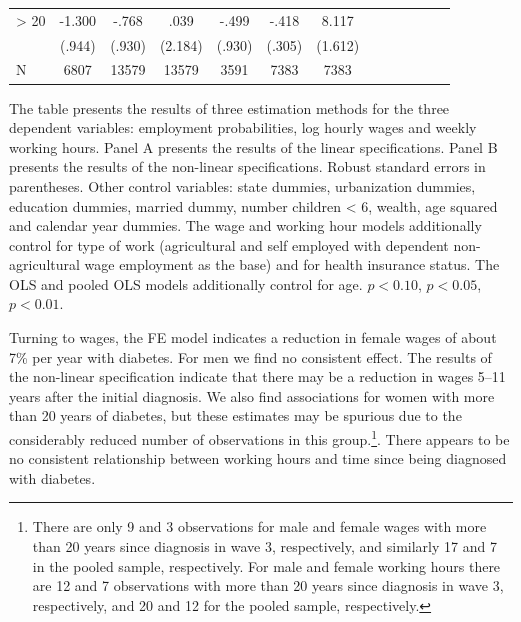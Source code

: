 \begin{table}
\begin{center}
\begin{adjustbox}{max width=\textwidth}
\begin{threeparttable}
{\begin{tabular}{l*{6}{S
S}}
\hspace*{10mm}> 20&  -1.300         &    -.768         &     .039         &    -.499         &    -.418         &    8.117\sym{***}\\
                &   (.944)         &   (.930)         &  (2.184)         &   (.930)         &   (.305)         &  (1.612)         \\
\midrule
N               &     6807         &    13579         &    13579         &     3591         &     7383         &     7383         \\
\bottomrule
\end{tabular}
\begin{tablenotes}
\item The table presents the results of three estimation methods for the three dependent variables: employment probabilities, log hourly wages and weekly working hours. Panel A presents the results of the linear specifications. Panel B presents the results of the non-linear specifications. Robust standard errors in parentheses. Other control variables: state dummies, urbanization dummies, education dummies, married dummy, number children < 6, wealth, age squared and calendar year dummies. The wage and working hour models additionally control for type of work (agricultural and self employed with dependent non-agricultural wage employment as the base) and for health insurance status. The OLS and pooled OLS models additionally control for age. \sym{*} \(p<0.10\), \sym{**} \(p<0.05\), \sym{***} \(p<0.01\).
\end{tablenotes}
}
\end{threeparttable}
\end{adjustbox}
\end{center}
\end{table}


Turning to wages, the \ac{FE} model indicates a reduction in female wages of about 7\% per year with diabetes. For men we find no consistent effect. The results of the non-linear specification indicate that there may be a reduction in wages 5--11 years after the initial diagnosis. We also find associations for women with more than 20 years of diabetes, but these estimates may be spurious due to the considerably reduced number of observations in this group.\footnote{There are only 9 and 3 observations for male and female wages with more than 20 years since diagnosis in wave 3, respectively, and similarly 17 and 7 in the pooled sample, respectively. For male and female working hours there are 12 and 7 observations with more than 20 years since diagnosis in wave 3, respectively, and 20 and 12 for the pooled sample, respectively.}. There appears to be no consistent relationship between working hours and time since being diagnosed with diabetes.
   


